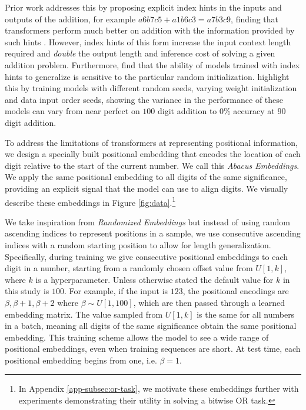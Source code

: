 \documentclass{article}
\begin{document}
Prior work addresses this by proposing explicit index hints in the inputs and outputs of the addition, for example $a6b7c5+a1b6c3=a7b3c9$, finding that transformers perform much better on addition with the information provided by such hints \citep{zhou2023algorithms, zhou2024transformers}.
However, index hints of this form increase the input context length required and \textit{double} the output length and inference cost of solving a given addition problem. 
Furthermore, \citet{zhou2024transformers} find that the ability of models trained with index hints to generalize is sensitive to the particular random initialization.
\citet{zhou2024transformers} highlight this by training models with different random seeds, varying weight initialization and data input order seeds, showing the variance in the performance of these models can vary from near perfect on \(100\) digit addition to \(0\)\% accuracy at \(90\) digit addition.

To address the limitations of transformers at representing positional information, we design a specially built positional embedding that encodes the location of each digit relative to the start of the current number.  We call this \textit{Abacus Embeddings}. We apply the same positional embedding to all digits of the same significance,  providing an explicit signal that the model can use to align digits. 
We visually describe these embeddings in Figure \ref{fig:data}.\footnote{In Appendix \ref{app-subsec:or-task}, we motivate these embeddings further with experiments demonstrating their utility in solving a bitwise OR task.}

We take inspiration from \textit{Randomized Embeddings} \citep{ruoss2023randomized} but instead of using random ascending indices to represent positions in a sample, we use consecutive ascending indices with a random starting position to allow for length generalization.
Specifically, during training we give consecutive positional embeddings to each digit in a number, starting from a randomly chosen offset value from \(U[1,k]\), where \(k\) is a hyperparameter.
Unless otherwise stated the default value for $k$ in this study is $100$.
For example, if the input is \(123\), the positional encodings are \(\beta,\beta+1,\beta+2\) where \(\beta \sim U[1,100]\), which are then passed through a learned embedding matrix.
The value sampled from \(U[1,k]\) is the same for all numbers in a batch, meaning all digits of the same significance obtain the same positional embedding. This training scheme allows the model to see a wide range of positional embeddings, even when training sequences are short. 
At test time, each positional embedding begins from one, i.e. \(\beta = 1\).
\end{document}
